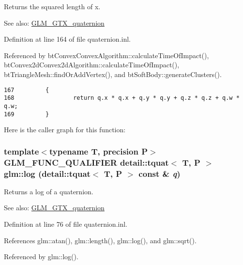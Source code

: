 Returns the squared length of x.

\begin{Desc}
\item[See also:]\hyperlink{group__gtx__quaternion}{GLM\_\-GTX\_\-quaternion} \end{Desc}


Definition at line 164 of file quaternion.inl.

Referenced by btConvexConvexAlgorithm::calculateTimeOfImpact(), btConvex2dConvex2dAlgorithm::calculateTimeOfImpact(), btTriangleMesh::findOrAddVertex(), and btSoftBody::generateClusters().

\begin{Code}\begin{verbatim}167         {
168                 return q.x * q.x + q.y * q.y + q.z * q.z + q.w * q.w;
169         }
\end{verbatim}
\end{Code}




Here is the caller graph for this function:\hypertarget{group__gtx__quaternion_gbed81c73a777fce84fe442bbc17c13ce}{
\subsubsection[log]{\setlength{\rightskip}{0pt plus 5cm}template$<$typename T, precision P$>$ GLM\_\-FUNC\_\-QUALIFIER detail::tquat$<$ T, P $>$ glm::log (detail::tquat$<$ T, P $>$ const \& {\em q})}}
\label{group__gtx__quaternion_gbed81c73a777fce84fe442bbc17c13ce}


Returns a log of a quaternion.

\begin{Desc}
\item[See also:]\hyperlink{group__gtx__quaternion}{GLM\_\-GTX\_\-quaternion} \end{Desc}


Definition at line 76 of file quaternion.inl.

References glm::atan(), glm::length(), glm::log(), and glm::sqrt().

Referenced by glm::log().

